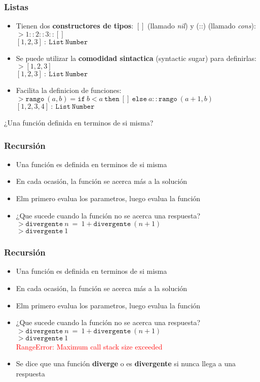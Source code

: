 \documentclass{beamer}
\begin{document}
\begin{frame}
\frametitle{Listas}
\begin{itemize}
    \item{Tienen dos {\bf constructores de tipos}: $[]$ (llamado \emph{nil}) y (::) (llamado \emph{cons}):\\
    $>1::2::3::[]$\\
    $[1,2,3]\ :\ \mathtt{List\ Number}$}
    \item{Se puede utilizar la {\bf comodidad sintactica} (syntactic sugar) para definirlas:\\
    $>[1,2,3]$\\
    $[1,2,3]\ :\ \mathtt{List\ Number}$}
    \item{Facilita la definicion de funciones:\\
    $>\mathtt{rango}\ (a,b) = \mathtt{if}\ b<a\ \mathtt{then}\ []\ \mathtt{else}\ a::\mathtt{rango}\ (a+1,b)$\\
    $[1,2,3,4]\ :\ \mathtt{List\ Number}$
    }
\end{itemize}
¿Una funci\'on definida en terminos de si misma?
\end{frame}


\begin{frame}
\frametitle{Recursi\'on}
\begin{itemize}
    \item{Una funci\'on es definida en terminos de si misma}
    \item{En cada ocasi\'on, la funci\'on se acerca m\'as a la soluci\'on}
    \item{Elm primero evalua los parametros, luego evalua la funci\'on}
    \item{¿Que sucede cuando la funci\'on no se acerca una respuesta?\\
    $>\mathtt{divergente}\ n\ =\ 1+\mathtt{divergente}\ (n+1)$\\
    $>\mathtt{divergente}\ 1$}
\end{itemize}
\end{frame}

\begin{frame}
    \frametitle{Recursi\'on}
    \begin{itemize}
        \item{Una funci\'on es definida en terminos de si misma}
        \item{En cada ocasi\'on, la funci\'on se acerca m\'as a la soluci\'on}
        \item{Elm primero evalua los parametros, luego evalua la funci\'on}
        \item{¿Que sucede cuando la funci\'on no se acerca una respuesta?\\
        $>\mathtt{divergente}\ n\ =\ 1+\mathtt{divergente}\ (n+1)$\\
        $>\mathtt{divergente}\ 1$\\
        \textcolor{red}{RangeError: Maximum call stack size exceeded}}
        \item{Se dice que una funci\'on {\bf diverge} o es {\bf divergente} si
        nunca llega a una respuesta}
    \end{itemize}
\end{frame}
\end{document}
